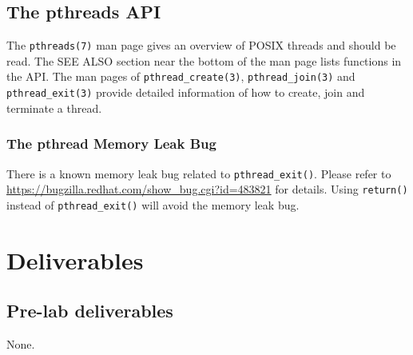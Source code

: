\subsection{The pthreads API}
\label{sec:pthreads}
The \verb+pthreads(7)+ man page gives an overview of POSIX threads and should be read. The SEE ALSO section near the bottom of the man page lists functions in the API. The man pages of \verb+pthread_create(3)+, \verb+pthread_join(3)+ and \verb+pthread_exit(3)+ provide detailed information of how to create, join and terminate a thread.

\subsubsection{The pthread Memory Leak Bug}
\label{sec:pthread-memory-leak}

There is a known memory leak bug related to \verb+pthread_exit()+. Please refer to  \url{https://bugzilla.redhat.com/show_bug.cgi?id=483821} for details. Using \verb+return()+ instead of \verb+pthread_exit()+ will avoid the memory leak bug.

\section{Deliverables}

\subsection{Pre-lab deliverables}
\label{sec:lab2-pre-lab-deliverable}
None.
\iffalse
Create a single-threaded implementation of the \verb+paster+ command. Pre-lab is due by the time that your scheduled lab sessions starts. No late submission of pre-lab is accepted. Grace days are not applicable to pre-lab submissions. The following are the steps to create your pre-lab deliverable submission.
\begin{itemize}
\item Create a directory and name it \verb+lab2-pre+.
\item Put the entire source code with a Makefile under the directory \verb+lab2-pre+. The Makefile default target is \verb+paster+. That is command \verb+make+ should generate the \verb+paster+ executable file. We also expect that command \verb+make clean+ will remove the object code and the default target. That is the \verb+.o+ files and the two executable files should be removed.
\item Use \verb+zip+ command to zip up the contents of lab2-pre directory and name it lab2-pre.zip. We expect \verb+unzip lab2-pre.zip+ will produce a \verb+lab2-pre+ sub-directory in the current working directory and under the \verb+lab2-pre+ sub-directory is your source code and the Makefile.
\end{itemize}
Submit the \verb+lab2-pre.zip+ file to Lab2 Pre-lab Dropbox in Learn.
\fi
